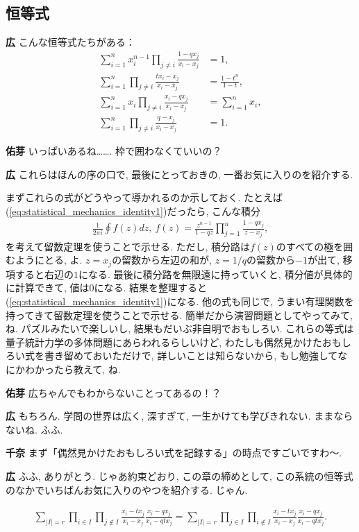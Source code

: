 \documentclass{ltjsarticle}
\theoremstyle{definition}
\newcommand{\parno}{\par\noindent}
\begin{document}
\subsection{恒等式}
\noindent
\textbf{広} こんな恒等式たちがある：
\begin{align}
  \sum_{i=1}^nx_i^{n-1}\prod_{j\ne i}\frac{1-qx_j}{x_i-x_j}&=1,\label{eq:statistical_mechanics_identity1}\\
  \sum_{i=1}^n\prod_{j\ne i}\frac{tx_i-x_j}{x_i-x_j}&=\frac{1-t^n}{1-t},\\
  \sum_{i=1}^nx_i\prod_{j\ne i}\frac{x_i-qx_j}{x_i-x_j}&=\sum_{i=1}^nx_i,\\
  \sum_{i=1}^n\prod_{j\ne i}\frac{q-x_j}{x_i-x_j}&=1.
\end{align}
\parno
\textbf{佑芽} いっぱいあるね……. 枠で囲わなくていいの？\parno
\textbf{広} これらはほんの序の口で, 最後にとっておきの, 一番お気に入りのを紹介する.\par
まずこれらの式がどうやって導かれるのか示しておく. たとえば(\ref{eq:statistical_mechanics_identity1})だったら, こんな積分
\begin{gather}
  \frac1{2\pi i}\oint f(z)dz,\ f(z)=\frac{z^{n-1}}{1-qz}\prod_{j=1}^n\frac{1-qx_j}{z-x_j},
\end{gather}
を考えて留数定理を使うことで示せる. ただし, 積分路は$f(z)$のすべての極を囲むようにとる, よ. $z=x_j$の留数から左辺の和が, $z=1/q$の留数から$-1$が出て, 移項すると右辺の$1$になる. 最後に積分路を無限遠に持っていくと, 積分値が具体的に計算できて, 値は0になる. 結果を整理すると(\ref{eq:statistical_mechanics_identity1})になる. 他の式も同じで, うまい有理関数を持ってきて留数定理を使うことで示せる. 簡単だから演習問題としてやってみて, ね. パズルみたいで楽しいし, 結果もだいぶ非自明でおもしろい. これらの等式は量子統計力学の多体問題にあらわれるらしいけど, わたしも偶然見かけたおもしろい式を書き留めておいただけで, 詳しいことは知らないから, もし勉強してなにかわかったら教えて, ね.\parno
\textbf{佑芽} 広ちゃんでもわからないことってあるの！？\parno
\textbf{広} もちろん. 学問の世界は広く, 深すぎて, 一生かけても学びきれない. ままならないね. ふふ.\parno
\textbf{千奈} まず「偶然見かけたおもしろい式を記録する」の時点ですごいですわ〜.\parno
\textbf{広} ふふ, ありがとう. じゃあ約束どおり, この章の締めとして, この系統の恒等式のなかでいちばんお気に入りのやつを紹介する. じゃん.
\begin{tcolorbox}
  \begin{gather}
    \sum_{|I|=r}\prod_{i\in I}\prod_{j\notin I}\frac{x_i-tx_j}{x_i-x_j}\frac{x_i-qx_j}{x_i-qtx_j}=\sum_{|I|=r}\prod_{j\in I}\prod_{i\notin I}\frac{x_i-tx_j}{x_i-x_j}\frac{x_i-qx_j}{x_i-qtx_j}.
  \end{gather}
\end{tcolorbox}
\end{document}
